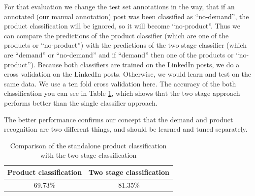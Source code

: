 For that evaluation we change the test set annotations in the way, that if an annotated (our manual annotation) post was been classified as ``no-demand'', the product classification will be ignored, so it will become ``no-product''.
Thus we can compare the predictions of the product classifier (which are one of the products or ``no-product'') with the predictions of the two stage classifier (which are ``demand'' or ``no-demand'' and if ``demand'' then one of the products or ``no-product'').
Because both classifiers are trained on the LinkedIn posts, we do a cross validation on the LinkedIn posts.
Otherwise, we would learn and test on the same data.
We use a ten fold cross validation here.
The accuracy of the both classification you can see in Table \ref{table:two_stage_eval}, which shows that the two stage approach performs better than the single classifier approach.

The better performance confirms our concept that the demand and product recognition are two different things, and should be learned and tuned separately.

\begin{table}
	\centering
	\begin{tabular}{c|c}
		\hline
		Product classification & Two stage classification \\ \hline \hline
		69.73\% & 81.35\% \\ \hline
	\end{tabular}
	\caption{Comparison of the standalone product classification with the two stage classification}
	\label{table:two_stage_eval}
\end{table}
